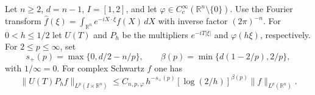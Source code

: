 Let \(n\ge2\), \(d=n-1\), \(I=[1,2]\), and let
\(\varphi\in C_c^\infty(\mathbb R^n\setminus\{0\})\).
Use the Fourier transform
\(\widehat f(\xi)=\int_{\mathbb R^n} e^{-iX\cdot\xi}f(X)\,dX\)
with inverse factor \((2\pi)^{-n}\). For \(0<h\le1/2\) let
\(U(T)\) and \(P_h\) be the multipliers \(e^{-iT|\xi|}\) and
\(\varphi(h\xi)\), respectively. For \(2\le p\le\infty\), set
\[
 s_+(p)=\max\{0,d/2-n/p\},\qquad
 \beta(p)=\min\{d(1-2/p),2/p\},
\]
with \(1/\infty=0\). For complex Schwartz \(f\) one has
\[
 \|U(T)P_hf\|_{L^p(I\times\mathbb R^n)}
 \le C_{n,p,\varphi}\,h^{-s_+(p)}[\log(2/h)]^{\beta(p)}
                 \|f\|_{L^p(\mathbb R^n)} .
\]

